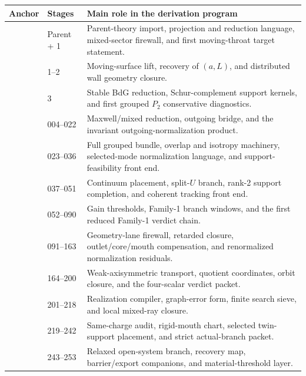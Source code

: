 \begin{longtable}{L{0.13\textwidth}L{0.14\textwidth}L{0.62\textwidth}}
\toprule
Anchor & Stages & Main role in the derivation program \\
\midrule
\endhead
{} & Parent + 1 & Parent-theory import, projection and
reduction language, mixed-sector firewall, and first moving-throat target
statement. \\
\addlinespace
{} & 1--2 & Moving-surface lift, recovery of \((a,L)\), and
distributed wall geometry closure. \\
\addlinespace
{} & 3 & Stable BdG reduction, Schur-complement support
kernels, and first grouped \(P_2\) conservative diagnostics. \\
\addlinespace
{} & 004--022 & Maxwell/mixed reduction, outgoing bridge, and
the invariant outgoing-normalization product. \\
\addlinespace
{} & 023--036 & Full grouped bundle, overlap and isotropy
machinery, selected-mode normalization language, and support-feasibility front
end. \\
\addlinespace
{} & 037--051 & Continuum placement, split-\(U\) branch,
rank-2 support completion, and coherent tracking front end. \\
\addlinespace
{} & 052--090 & Gain thresholds, Family-1 branch windows, and
the first reduced Family-1 verdict chain. \\
\addlinespace
{} & 091--163 & Geometry-lane firewall, retarded closure,
outlet/core/mouth compensation, and renormalized normalization residuals. \\
\addlinespace
{} & 164--200 & Weak-axisymmetric transport, quotient
coordinates, orbit closure, and the four-scalar verdict packet. \\
\addlinespace
{} & 201--218 & Realization compiler, graph-error form,
finite search sieve, and local mixed-ray closure. \\
\addlinespace
{} & 219--242 & Same-charge audit, rigid-mouth chart,
selected twin-support placement, and strict actual-branch packet. \\
\addlinespace
{} & 243--253 & Relaxed open-system branch, recovery map,
barrier/export companions, and material-threshold layer. \\
\bottomrule
\end{longtable}

